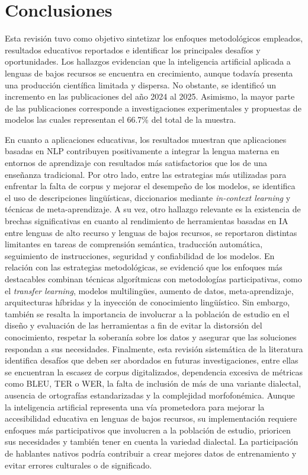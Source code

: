 \section{Conclusiones}
Esta revisión tuvo como objetivo sintetizar los enfoques metodológicos empleados, resultados educativos reportados e identificar los principales desafíos y oportunidades. Los hallazgos evidencian que la inteligencia artificial aplicada a lenguas de bajos recursos se encuentra en crecimiento, aunque todavía presenta una producción científica limitada y dispersa. No obstante, se identificó un incremento en las publicaciones del año 2024 al 2025. Asimismo, la mayor parte de las publicaciones corresponde a investigaciones experimentales y propuestas de modelos las cuales representan el 66.7\% del total de la muestra. 

En cuanto a aplicaciones educativas, los resultados muestran que aplicaciones basadas en NLP contribuyen positivamente a integrar la lengua materna en entornos de aprendizaje con resultados más satisfactorios que los de una enseñanza tradicional. Por otro lado, entre las estrategias más utilizadas para enfrentar la falta de corpus y mejorar el desempeño de los modelos, se identifica el uso de descripciones lingüísticas, diccionarios mediante \textit{in-context learning} y técnicas de meta-aprendizaje. A su vez, otro hallazgo relevante es la existencia de brechas significativas en cuanto al rendimiento de herramientas basadas en IA entre lenguas de alto recurso y lenguas de bajos recursos, se reportaron distintas limitantes en tareas de comprensión semántica, traducción automática, seguimiento de instrucciones, seguridad y confiabilidad de los modelos.
En relación con las estrategias metodológicas, se evidenció que los enfoques más destacables combinan técnicas algorítmicas con metodologías participativas, como el \textit{transfer learning}, modelos multilingües, aumento de datos, meta-aprendizaje, arquitecturas híbridas y la inyección de conocimiento lingüístico. Sin embargo, también se resalta la importancia de involucrar a la población de estudio en el diseño y evaluación de las herramientas a fin de evitar la distorsión del conocimiento, respetar la soberanía sobre los datos y asegurar que las soluciones respondan a sus necesidades.
Finalmente, esta revisión sistemática de la literatura identifica desafíos que deben ser abordados en futuras investigaciones, entre ellas se encuentran la escasez de corpus digitalizados, dependencia excesiva de métricas como BLEU, TER o WER, la falta de inclusión de más de una variante dialectal, ausencia de ortografías estandarizadas y la complejidad morfofonémica. Aunque la inteligencia artificial representa una vía prometedora para mejorar la accesibilidad educativa en lenguas de bajos recursos, su implementación requiere enfoques más participativos que involucren a la población de estudio, prioricen sus necesidades y también tener en cuenta la variedad dialectal. La participación de hablantes nativos podría contribuir a crear mejores datos de entrenamiento y evitar errores culturales o de significado.



